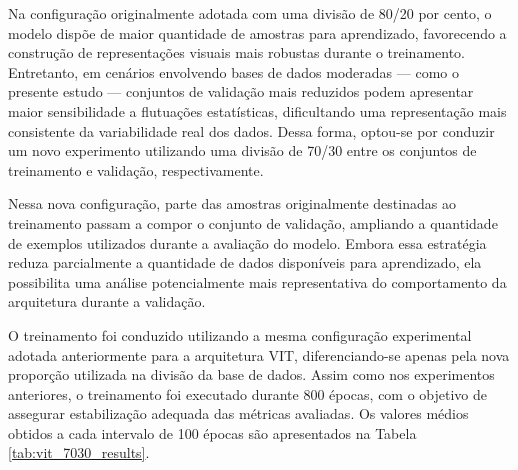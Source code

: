 Na configuração originalmente adotada com uma divisão de 80/20 por cento, o modelo dispõe de maior quantidade de amostras para aprendizado, favorecendo a construção de representações visuais mais robustas durante o treinamento. Entretanto, em cenários envolvendo bases de dados moderadas — como o presente estudo — conjuntos de validação mais reduzidos podem apresentar maior sensibilidade a flutuações estatísticas, dificultando uma representação mais consistente da variabilidade real dos dados. Dessa forma, optou-se por conduzir um novo experimento utilizando uma divisão de 70/30 entre os conjuntos de treinamento e validação, respectivamente.

Nessa nova configuração, parte das amostras originalmente destinadas ao treinamento passam a compor o conjunto de validação, ampliando a quantidade de exemplos utilizados durante a avaliação do modelo. Embora essa estratégia reduza parcialmente a quantidade de dados disponíveis para aprendizado, ela possibilita uma análise potencialmente mais representativa do comportamento da arquitetura durante a validação.

O treinamento foi conduzido utilizando a mesma configuração experimental adotada anteriormente para a arquitetura \acs{VIT}, diferenciando-se apenas pela nova proporção utilizada na divisão da base de dados. Assim como nos experimentos anteriores, o treinamento foi executado durante 800 épocas, com o objetivo de assegurar estabilização adequada das métricas avaliadas. Os valores médios obtidos a cada intervalo de 100 épocas são apresentados na Tabela \ref{tab:vit_7030_results}.

